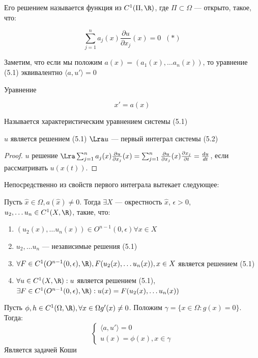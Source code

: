 Его решением называется функция из \(C^1(\Pi, \R)\), где \(\Pi \subset \Omega\) --- открыто, такое, что:

\[\sum_{j = 1}^n a_j(x)\frac{\partial u}{\partial x_j}(x) = 0 \;\;(*)\]

\begin{note}
    Заметим, что если мы положим \(a(x) = (a_1(x), \dots a_n(x))\), то уравнение (5.1) эквивалентно \(\langle a, u' \rangle = 0\)
\end{note}

Уравнение

\begin{equation}
    x' = a(x)
\end{equation}

Называется характеристическим уравнением системы (5.1)

\begin{note}
    \(u\) является решением (5.1) \(\Lra u\) --- первый интеграл системы (5.2)
\end{note}
\begin{proof}
    \(u\) решение \(\Lra \sum_{j = 1}^n a_j(x)\frac{\partial u}{\partial x_j}(x) = \sum_{j = 1}^n \frac{\partial u}{\partial x_j}(x) \frac{\partial x_j}{\partial t} = \frac{du}{dt}\), если рассматривать \(u(x(t))\).
\end{proof}

Непосредственно из свойств первого интеграла вытекает следующее:

\begin{corollary}
    Пусть \(\hat{x} \in \Omega, a(\hat{x}) \ne 0\). Тогда \(\exists X\) --- окрестность \(\hat{x}\), \(\epsilon > 0\), \(u_2, \dots u_n \in C^1(X, \R)\), такие, что:
    \begin{enumerate}
        \item \((u_2(x), \dots u_n(x)) \in O^{n - 1}(0, \epsilon) \forall x \in X\)
        \item \(u_2, \dots u_n\) --- независимые решения (5.1)
        \item \(\forall F \in C^1(O^{n - 1}(0, \epsilon), \R), F(u_2(x), \dots u_n(x)), x \in X\) является решением (5.1)
        \item \(\forall u \in C^1(X, \R): u\) является решением (5.1), \(\exists F \in C^1(O^{n - 1}(0, \epsilon), \R): u(x) = F(u_2(x), \dots u_n(x))\)
    \end{enumerate}
\end{corollary}

Пусть \(\phi, h \in C^1(\Omega, \R), \forall x \in \Omega g'(x) \ne 0\). Положим \(\gamma = \{x \in \Omega: g(x) = 0\}\). Тогда:
\begin{equation}
    \begin{cases}
        \langle a, u' \rangle = 0 \\
        u(x) = \phi(x), x \in \gamma
    \end{cases}
\end{equation}
Является задачей Коши


